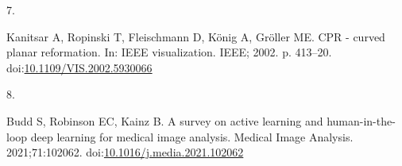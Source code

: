 \documentclass[
  11pt,
]{article}
\newlength{\cslhangindent}
\newlength{\csllabelwidth}
\newenvironment{CSLReferences}[2] %
 {\begin{list}{}{%
  \setlength{\itemindent}{0pt}
  \setlength{\leftmargin}{0pt}
  \setlength{\parsep}{0pt}
  \ifodd #1
   \setlength{\leftmargin}{\cslhangindent}
   \setlength{\itemindent}{-1\cslhangindent}
  \fi
  \setlength{\itemsep}{#2\baselineskip}}}
 {\end{list}}
\newcommand{\CSLLeftMargin}[1]{\parbox[t]{\csllabelwidth}{\strut#1\strut}}
\newcommand{\CSLRightInline}[1]{\parbox[t]{\linewidth - \csllabelwidth}{\strut#1\strut}}
\begin{document}
\begin{CSLReferences}{0}{1}
\CSLLeftMargin{7. }%
\CSLRightInline{Kanitsar A, Ropinski T, Fleischmann D, König A, Gröller
ME. CPR - curved planar reformation. In: IEEE visualization. IEEE; 2002.
p. 413--20.
doi:\href{https://doi.org/10.1109/VIS.2002.5930066}{10.1109/VIS.2002.5930066}}

\CSLLeftMargin{8. }%
\CSLRightInline{Budd S, Robinson EC, Kainz B. A survey on active
learning and human-in-the-loop deep learning for medical image analysis.
Medical Image Analysis. 2021;71:102062.
doi:\href{https://doi.org/10.1016/j.media.2021.102062}{10.1016/j.media.2021.102062}}

\end{CSLReferences}
\end{document}
